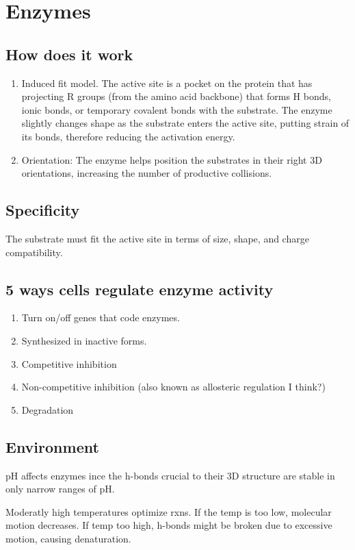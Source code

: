 \documentclass[12pt]{article}
\begin{document}
\section{Enzymes}
\subsection{How does it work}
\begin{enumerate}
    \item Induced fit model. 
    The active site is a pocket on the protein that has projecting 
    R groups (from the amino acid backbone) that forms H bonds, 
    ionic bonds, or temporary covalent bonds with the substrate. 
    The enzyme slightly changes shape as the substrate
    enters the active site, putting strain of its bonds, therefore
    reducing the activation energy.
    \item Orientation: The enzyme helps position the substrates in 
    their right 3D orientations, increasing the number of 
    productive collisions. 
\end{enumerate}

\subsection{Specificity}
The substrate must fit the active site in terms of size, shape, and 
charge compatibility. 

\subsection{5 ways cells regulate enzyme activity}
\begin{enumerate}
    \item Turn on/off genes that code enzymes.
    \item Synthesized in inactive forms.
    \item Competitive inhibition
    \item Non-competitive inhibition (also known as allosteric regulation I think?)
    \item Degradation
\end{enumerate}

\subsection{Environment}
pH affects enzymes ince the h-bonds crucial to their 3D structure
are stable in only narrow ranges of pH. 

Moderatly high temperatures optimize rxns. If the temp is too low, 
molecular motion decreases. If temp too high, h-bonds might 
be broken due to excessive motion, causing denaturation. 
\end{document}
